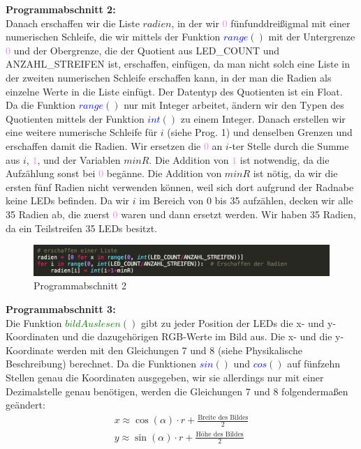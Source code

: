 \documentclass [a4paper, 11pt] {article}
\begin{document}
\textbf{\large Programmabschnitt 2:}\\
Danach erschaffen wir die Liste {$radien$}, in der wir \textcolor{violet}{$0$} fünfunddreißigmal mit einer numerischen Schleife, die wir mittels der Funktion \textcolor{blue}{$range$}{$()$} mit der Untergrenze \textcolor{violet}{$0$} und der Obergrenze, die der Quotient aus LED\_COUNT und ANZAHL\_STREIFEN ist, erschaffen, einfügen, da man nicht solch eine Liste in der zweiten numerischen Schleife erschaffen kann, in der man die Radien als einzelne Werte in die Liste einfügt. Der Datentyp des Quotienten ist ein Float. Da die Funktion \textcolor{blue}{$range$}{$()$} nur mit Integer arbeitet, ändern wir den Typen des Quotienten mittels der Funktion \textcolor{blue}{$int$}{$()$} zu einem Integer. Danach erstellen wir eine weitere numerische Schleife für {$i$} (siehe Prog. 1) und denselben Grenzen und erschaffen damit die Radien. Wir ersetzen die \textcolor{violet}{$0$} an {$i$}-ter Stelle durch die Summe aus {$i$}, \textcolor{violet}{$1$}, und der Variablen {$minR$}. Die Addition von \textcolor{violet}{$1$} ist notwendig, da die Aufzählung sonst bei \textcolor{violet}{$0$} begänne. Die Addition von {$minR$} ist nötig, da wir die ersten fünf Radien nicht verwenden können, weil sich dort aufgrund der Radnabe keine LEDs befinden. 
Da wir {$i$} im Bereich von 0 bis 35 aufzählen, decken wir alle 35 Radien ab, die zuerst \textcolor{violet}{$0$} waren und dann ersetzt werden. Wir haben 35 Radien, da ein Teilstreifen 35 LEDs besitzt.
\begin{figure}[H]
	\centering
	\includegraphics[width=16cm]{P2.png}
	\caption{Programmabschnitt 2}
	\label{P2}
\end{figure}
\textbf{\large Programmabschnitt 3:}\\
Die Funktion \textcolor{green}{$bildAuslesen$}{$()$} gibt zu jeder Position der LEDs die x- und y-Koordinaten und die dazugehörigen RGB-Werte im Bild aus. Die x- und die y-Koordinate werden mit den Gleichungen 7 und 8 (siehe Physikalische Beschreibung) berechnet. Da die Funktionen \textcolor{blue}{$sin$}{$()$} und \textcolor{blue}{$cos$}{$()$} auf fünfzehn Stellen genau die Koordinaten ausgegeben, wir sie allerdings nur mit einer Dezimalstelle genau benötigen, werden die Gleichungen 7 und 8 folgendermaßen geändert:
\begin{align}
x \approx \cos (\alpha) \cdot r + \frac{\text{Breite \ des \ Bildes}}{2} \\
y \approx\sin (\alpha) \cdot r + \frac{\text{Höhe\ des\ Bildes}}{2}
\end{align}
\end{document}

